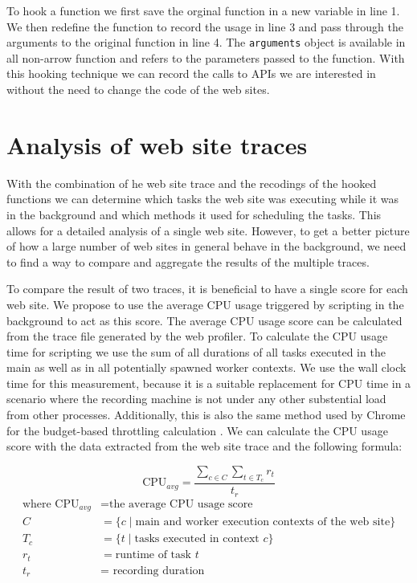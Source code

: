 \documentclass[
	ruledheaders=section,%
	class=report,%
	thesis={type=bachelor},%
	accentcolor=9c,%
	custommargins=true,%
	marginpar=false,%
	parskip=half-,%
	fontsize=11pt,%
]{tudapub}
\begin{document}
  To hook a function we first save the orginal function in a new variable in line 1. We then redefine the function to record the usage in line 3 and pass through the arguments to the original function in line 4. The \texttt{arguments} object is available in all non-arrow function and refers to the parameters passed to the function. With this hooking technique we can record the calls to APIs we are interested in without the need to change the code of the web sites.

  \section{Analysis of web site traces}
  \label{sec:trace-analysis}

  With the combination of he web site trace and the recodings of the hooked functions we can determine which tasks the web site was executing while it was in the background and which methods it used for scheduling the tasks. This allows for a detailed analysis of a single web site. However, to get a better picture of how a large number of web sites in general behave in the background, we need to find a way to compare and aggregate the results of the multiple traces.

  To compare the result of two traces, it is beneficial to have a single score for each web site. We propose to use the average CPU usage triggered by scripting in the background to act as this score. The average CPU usage score can be calculated from the trace file generated by the web profiler. To calculate the CPU usage time for scripting we use the sum of all durations of all tasks executed in the main as well as in all potentially spawned worker contexts. We use the wall clock time for this measurement, because it is a suitable replacement for CPU time in a scenario where the recording machine is not under any other substential load from other processes. Additionally, this is also the same method used by Chrome for the budget-based throttling calculation \cite{chrome-background-tabs}. We can calculate the CPU usage score with the data extracted from the web site trace and the following formula:

  \begin{equation*}
    \text{CPU}_{avg} = \frac{ \sum_{ c \in C } \sum_{ t \in T_c } r_t }{ t_r }
  \end{equation*}
  \begin{align*}
    \text{where CPU}_{avg} &= \text{the average CPU usage score} \\
    C &= \{ c \mid \text{main and worker execution contexts of the web site} \} \\
    T_c &= \{ t \mid \text{tasks executed in context } c \} \\
    r_t &= \text{runtime of task } t \\
    t_r &= \text{ recording duration }
  \end{align*}
\end{document}
